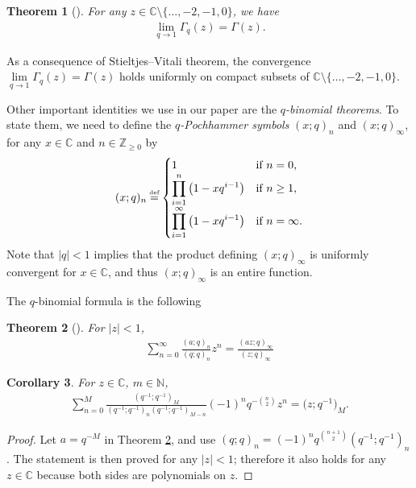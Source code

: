 \documentclass[pdftex]{sigma}
\numberwithin{equation}{section}
\newcommand\myeq{\mathrel{\stackrel{\makebox[0pt]{\mbox{\normalfont\tiny def}}}{=}}}
\newtheorem{thm}{Theorem}[section]
\newtheorem{cor}[thm]{Corollary}
\newcommand{\C}{\mathbb{C}}
\newcommand{\Z}{\mathbb{Z}}
\newcommand{\N}{\mathbb{N}}
\begin{document}
\begin{thm}[{\cite[Corollary~10.3.4]{AAR}}]\label{qtheory1}
For any $z\in\C \setminus \{\dots, -2, -1, 0\}$, we have
\begin{gather*}
\lim_{q\rightarrow 1}{\Gamma_q(z)} = \Gamma(z).
\end{gather*}
\end{thm}
\begin{rem}\label{qtheory1remark}
As a consequence of Stieltjes--Vitali theorem, the convergence $\lim\limits_{q\rightarrow 1}{\Gamma_q(z)} = \Gamma(z)$ holds uniformly on compact subsets of $\C \setminus \{\dots, -2, -1, 0\}$.
\end{rem}

Other important identities we use in our paper are the \textit{$q$-binomial theorems}. To state them, we need to def\/ine the \textit{$q$-Pochhammer symbols} $(x; q)_n$ and $(x; q)_{\infty}$, for any $x\in\C$ and $n\in\Z_{\geq 0}$ by
\begin{gather*}
(x; q)_n \myeq
 \begin{cases}
 1 & \textrm{if } n = 0,\\
 \displaystyle \prod\limits_{i=1}^n{\big(1 - xq^{i-1}\big)} & \textrm{if } n\geq 1,\\
 \displaystyle \prod\limits_{i=1}^{\infty}{\big(1 - xq^{i-1}\big)} & \textrm{if } n = \infty.
 \end{cases}
\end{gather*}
Note that $|q| < 1$ implies that the product def\/ining $(x; q)_{\infty}$ is uniformly convergent for $x\in\C$, and thus $(x; q)_{\infty}$ is an entire function.

The $q$-binomial formula is the following

\begin{thm}[{\cite[Theorem~10.2.1]{AAR}}]\label{qtheory2}
For $|z| < 1$,
\begin{gather*}
\sum_{n=0}^{\infty}{\frac{(a; q)_n}{(q; q)_n}z^n} = \frac{(az; q)_{\infty}}{(z; q)_{\infty}}
\end{gather*}
\end{thm}

\begin{cor}\label{qtheory25}
For $z\in\C$, $m\in\N$,
\begin{gather*}
\sum_{n=0}^M{\frac{(q^{-1}; q^{-1})_M}{(q^{-1}; q^{-1})_n(q^{-1}; q^{-1})_{M-n}}(-1)^nq^{-{n \choose 2}}z^n} = \big(z; q^{-1}\big)_M.
\end{gather*}
\end{cor}
\begin{proof}
Let $a = q^{-M}$ in Theorem \ref{qtheory2}, and use $(q; q)_n = (-1)^n q^{{n + 1 \choose 2}} (q^{-1}; q^{-1})_n$. The statement is then proved for any $|z| < 1$; therefore it also holds for any $z\in\C$ because both sides are polynomials on $z$.
\end{proof}
\end{document}
